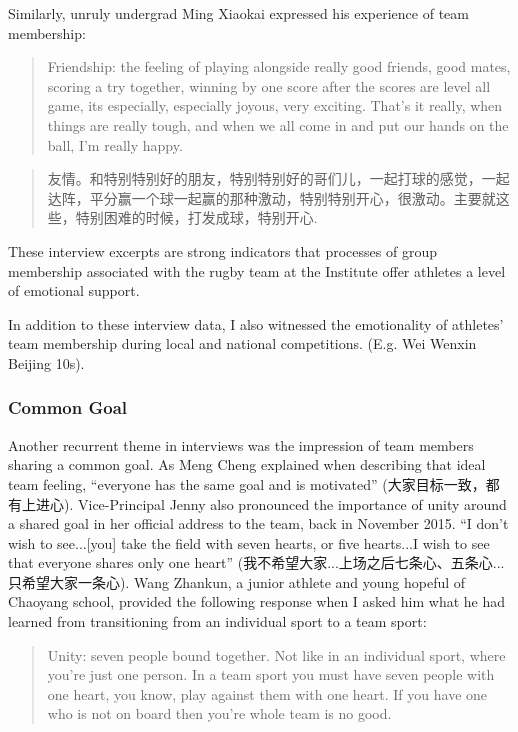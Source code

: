 \begin{CJK}{UTF8}{gbsn}
Similarly, unruly undergrad Ming Xiaokai expressed his experience of team membership:

    \begin{quotation}
      Friendship: the feeling of playing alongside really good friends, good mates, scoring a try together, winning by one score after the scores are level all game, its especially, especially joyous, very exciting.  That's it really, when things are really tough, and when we all come in and put our hands on the ball, I’m really happy.
    \end{quotation}

    \begin{quotation}
       友情。和特别特别好的朋友，特别特别好的哥们儿，一起打球的感觉，一起达阵，平分赢一个球一起赢的那种激动，特别特别开心，很激动。主要就这些，特别困难的时候，打发成球，特别开心.
    \end{quotation}

These interview excerpts are strong indicators that processes of group membership associated with the rugby team at the Institute offer athletes a level of emotional support.

In addition to these interview data, I also witnessed the emotionality of athletes' team membership during local and national competitions.  (E.g. Wei Wenxin Beijing 10s).



\subsubsection{Common Goal}

Another recurrent theme in interviews was the impression of team members sharing a common goal.  As Meng Cheng explained when describing that ideal team feeling, ``everyone has the same goal and is motivated'' (大家目标一致，都有上进心). Vice-Principal Jenny also pronounced the importance of unity around a shared goal in her official address to the team, back in November 2015.  ``I don't wish to see...[you] take the field with seven hearts, or five hearts...I wish to see that everyone shares only one heart'' (我不希望大家...上场之后七条心、五条心...只希望大家一条心).  Wang Zhankun, a junior athlete and young hopeful of Chaoyang school, provided the following response when I asked him what he had learned from transitioning from an individual sport to a team sport:

  \begin{quotation}
    Unity: seven people bound together.  Not like in an individual sport, where you’re just one person. In a team sport you must have seven people with one heart, you know, play against them with one heart.  If you have one who is not on board then you’re whole team is no good.
  \end{quotation}


\end{CJK}
